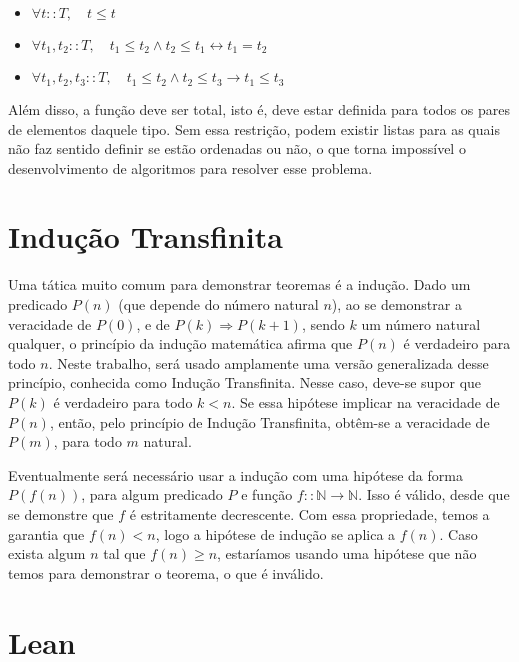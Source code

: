 \documentclass[12pt, oneside, a4paper,english,brazil]{abntex2}
\begin{document}
\begin{itemize}
  \item $\forall t :: T, \quad t \le t$
  \item $\forall t_{1}, t_{2} :: T, \quad t_{1} \le t_{2} \wedge t_{2} \le t_{1} \leftrightarrow t_{1} = t_{2}$
  \item $\forall t_{1}, t_{2}, t_{3} :: T, \quad t_{1} \le t_{2} \wedge t_{2} \le t_{3} \rightarrow t_{1} \le t_{3}$
\end{itemize}

\qquad Al\'em disso, a fun\c{c}\~ao deve ser total, isto \'e, deve estar definida para todos os pares de
elementos daquele tipo. Sem essa restri\c{c}\~ao, podem existir listas para as quais n\~ao faz sentido
definir se est\~ao ordenadas ou n\~ao, o que torna imposs\'ivel o desenvolvimento de algoritmos para resolver
esse problema.

\section{Indu\c{c}\~ao Transfinita}

\qquad Uma t\'atica muito comum para demonstrar teoremas \'e a indu\c{c}\~ao. Dado um predicado $P(n)$ (que
depende do n\'umero natural $n$), ao se demonstrar a veracidade de $P(0)$, e de $P(k) \Rightarrow P(k + 1)$,
sendo $k$ um n\'umero natural qualquer, o princ\'ipio da indu\c{c}\~ao matem\'atica afirma que $P(n)$ \'e
verdadeiro para todo $n$. Neste trabalho, ser\'a usado amplamente uma vers\~ao generalizada desse
princ\'ipio, conhecida como Indu\c{c}\~ao Transfinita. Nesse caso, deve-se supor que $P(k)$ \'e verdadeiro
para todo $k < n$. Se essa hip\'otese implicar na veracidade de $P(n)$, ent\~ao, pelo princ\'ipio de
Indu\c{c}\~ao Transfinita, obt\^em-se a veracidade de $P(m)$, para todo $m$ natural.

\qquad Eventualmente ser\'a necess\'ario usar a indu\c{c}\~ao com uma hip\'otese da forma $P(f(n))$, para
algum predicado $P$ e fun\c{c}\~ao $f :: \mathbb{N} \rightarrow \mathbb{N}$. Isso \'e v\'alido, desde que se
demonstre que $f$ \'e estritamente decrescente. Com essa propriedade, temos a garantia que $f(n) < n$,
logo a hip\'otese de indu\c{c}\~ao se aplica a $f(n)$. Caso exista algum $n$ tal que $f(n) \geq n$,
estar\'iamos usando uma hip\'otese que n\~ao temos para demonstrar o teorema, o que \'e inv\'alido.

\section{Lean}
\end{document}
